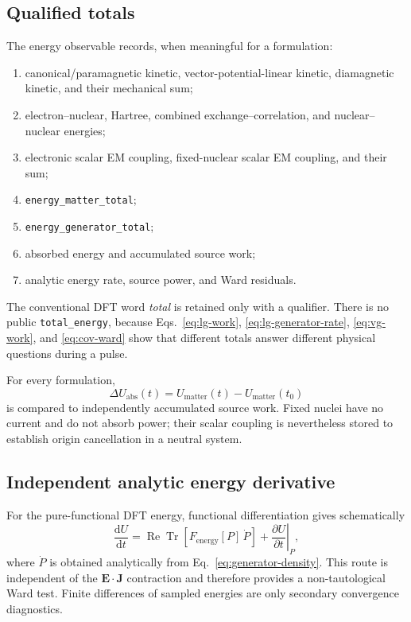\documentclass[11pt]{article}
\newcommand{\dd}{\mathrm{d}}
\newcommand{\ReTr}{\operatorname{Re}\operatorname{Tr}}
\newcommand{\vect}[1]{\bm{#1}}
\newcommand{\code}[1]{\texttt{#1}}
\begin{document}
\subsection{Qualified totals}

The energy observable records, when meaningful for a formulation:

\begin{enumerate}
\item canonical/paramagnetic kinetic, vector-potential-linear kinetic,
  diamagnetic kinetic, and their mechanical sum;
\item electron--nuclear, Hartree, combined exchange--correlation, and
  nuclear--nuclear energies;
\item electronic scalar EM coupling, fixed-nuclear scalar EM coupling, and
  their sum;
\item \code{energy\_matter\_total};
\item \code{energy\_generator\_total};
\item absorbed energy and accumulated source work;
\item analytic energy rate, source power, and Ward residuals.
\end{enumerate}

The conventional DFT word \emph{total} is retained only with a qualifier.
There is no public \code{total\_energy}, because
Eqs.~\eqref{eq:lg-work}, \eqref{eq:lg-generator-rate},
\eqref{eq:vg-work}, and \eqref{eq:cov-ward} show that different totals
answer different physical questions during a pulse.

For every formulation,
\begin{equation}
 \Delta U_{\mathrm{abs}}(t)
 =U_{\mathrm{matter}}(t)-U_{\mathrm{matter}}(t_0)
 \label{eq:absorbed-energy}
\end{equation}
is compared to independently accumulated source work. Fixed nuclei have no
current and do not absorb power; their scalar coupling is nevertheless stored
to establish origin cancellation in a neutral system.

\subsection{Independent analytic energy derivative}

For the pure-functional DFT energy, functional differentiation gives
schematically
\begin{equation}
 \frac{\dd U}{\dd t}
 =\ReTr\!\left[F_{\mathrm{energy}}[P]\,\dot P\right]
 +\left.\frac{\partial U}{\partial t}\right|_P,
 \label{eq:analytic-energy-rate}
\end{equation}
where \(\dot P\) is obtained analytically from
Eq.~\eqref{eq:generator-density}. This route is independent of the
\(\vect E\cdot\vect J\) contraction and therefore provides a
non-tautological Ward test. Finite differences of sampled energies are only
secondary convergence diagnostics.
\end{document}
